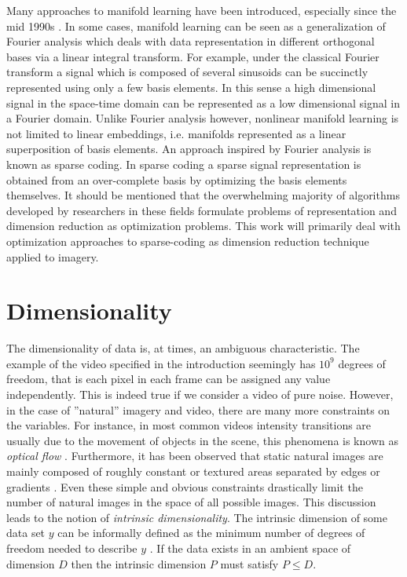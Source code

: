 \documentclass[12pt,a4paper]{article}
\begin{document}
Many approaches to manifold learning have been introduced, especially since the mid 1990s \cite{ManLearn}. In some cases, manifold learning can be seen as a generalization of Fourier analysis which deals with data representation in different orthogonal bases via a linear integral transform. For example, under the classical Fourier transform a signal which is composed of several sinusoids can be succinctly represented using only a few basis elements. In this sense a high dimensional signal in the space-time domain can be represented as a low dimensional signal in a Fourier domain. Unlike Fourier analysis however, nonlinear manifold learning is not limited to linear embeddings, i.e. manifolds represented as a linear superposition of basis elements. An approach inspired by Fourier analysis is known as sparse coding. In sparse coding a sparse signal representation is obtained from an over-complete basis by optimizing the basis elements themselves. It should be mentioned that the overwhelming majority of algorithms developed by researchers in these fields formulate problems of representation and dimension reduction as optimization problems. This work will primarily deal with optimization approaches to sparse-coding as dimension reduction technique applied to imagery.   
\section{Dimensionality}

The dimensionality of data is, at times, an ambiguous characteristic. The example of the video specified in the introduction seemingly has $10^9$ degrees of freedom, that is each pixel in each frame can be assigned any value independently. This is indeed true if we consider a video of pure noise. However, in the case of ''natural'' imagery and video, there are many more constraints on the variables. For instance, in most common videos intensity transitions are usually due to the movement of objects in the scene, this phenomena is known as \textit{optical flow} \cite{Vision}. Furthermore, it has been observed that static natural images are mainly composed of roughly constant or textured areas separated by edges or gradients \cite{Vision}. Even these simple and obvious constraints drastically limit the number of natural images in the space of all possible images. This discussion leads to the notion of \textit{intrinsic dimensionality}. The intrinsic dimension of some data set $y$ can be informally defined as the minimum number of degrees of freedom needed to describe $y$ \cite{ManLearn}. If the data exists in an ambient space of dimension $D$ then the intrinsic dimension $P$ must satisfy $P \leq D$.
\end{document}
